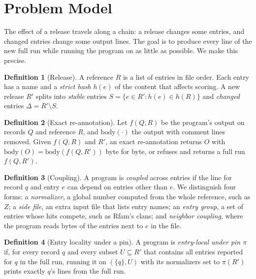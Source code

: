 \documentclass[letterpaper,twocolumn,10pt]{article}
\theoremstyle{definition}
\newtheorem{definition}{Definition}
\theoremstyle{plain}
\begin{document}
\section{Problem Model}
\label{sec:model}

The effect of a release travels along a chain: a release changes some entries, and changed entries change some
output lines. The goal is to produce every line of the new full run while running the program on as little as
possible. We make this precise.

\begin{definition}[Release]
A reference $R$ is a list of entries in file order. Each entry has a name and a \textit{strict hash} $h(e)$ of the
content that affects scoring. A new release $R'$ splits into \textit{stable} entries
$S = \{e \in R' : h(e) \in h(R)\}$ and \textit{changed} entries $\Delta = R' \setminus S$.
\end{definition}

\begin{definition}[Exact re\nobreakdash-annotation]
Let $f(Q,R)$ be the program's output on records $Q$ and reference $R$, and $\mathrm{body}(\cdot)$ the output with
comment lines removed. Given $f(Q,R)$ and $R'$, an exact re\nobreakdash-annotation returns $O$ with
$\mathrm{body}(O) = \mathrm{body}(f(Q,R'))$ byte for byte, or refuses and returns a full run $f(Q,R')$.
\end{definition}

\begin{definition}[Coupling]
A program is \textit{coupled} across entries if the line for record $q$ and entry $e$ can depend on entries other
than $e$. We distinguish four forms: a \textit{normalizer}, a global number computed from the whole reference, such as
$Z$; a \textit{side file}, an extra input file that lists entry names; an \textit{entry group}, a set of entries whose
hits compete, such as Rfam's clans; and \textit{neighbor coupling}, where the program reads bytes of the entries
next to $e$ in the file.
\end{definition}

\begin{definition}[Entry locality under a pin]
A program is \textit{entry-local under pin $\pi$} if, for every record $q$ and every subset $U \subseteq R'$ that
contains all entries reported for $q$ in the full run, running it on $(\{q\},U)$ with its normalizers set to $\pi(R')$
prints exactly $q$'s lines from the full run.
\end{definition}
\end{document}
